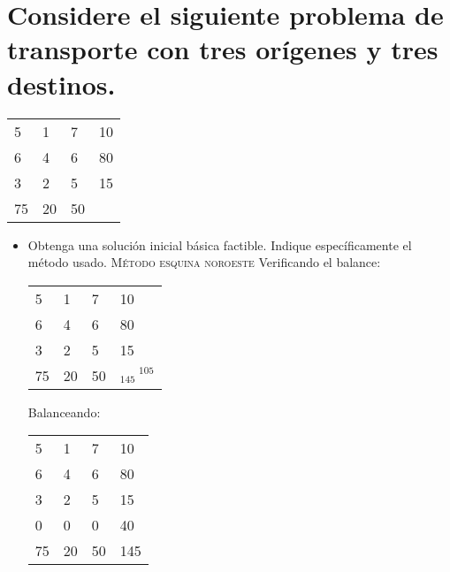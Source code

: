 \section{Considere el siguiente problema de transporte con tres orígenes y tres destinos.}
\centering
 \begin{tabular}{llll}
\cline{1-3}
\multicolumn{1}{|l|}{5} & \multicolumn{1}{l|}{1} & \multicolumn{1}{l|}{7} & 10 \\ \cline{1-3}
\multicolumn{1}{|l|}{6} & \multicolumn{1}{l|}{4} & \multicolumn{1}{l|}{6} & 80 \\ \cline{1-3}
\multicolumn{1}{|l|}{3} & \multicolumn{1}{l|}{2} & \multicolumn{1}{l|}{5} & 15 \\ \cline{1-3}
75 & 20 & 50 & 
\end{tabular}
 
\begin{itemize}
    



\item  Obtenga una solución inicial básica factible. Indique específicamente el método usado.    \textsc{M\'etodo esquina noroeste}
Verificando el balance:
\begin{center}
\begin{tabular}{llll}
\cline{1-3}
\multicolumn{1}{|l|}{5} & \multicolumn{1}{l|}{1} & \multicolumn{1}{l|}{7} & 10 \\ \cline{1-3}
\multicolumn{1}{|l|}{6} & \multicolumn{1}{l|}{4} & \multicolumn{1}{l|}{6} & 80 \\ \cline{1-3}
\multicolumn{1}{|l|}{3} & \multicolumn{1}{l|}{2} & \multicolumn{1}{l|}{5} & 15 \\ \cline{1-3}
75 & 20 & 50 & $_{145}\: ^{105}$
\end{tabular}    
\end{center}

    

Balanceando:\\

\begin{center}
\begin{tabular}{llll}
\cline{1-3}
\multicolumn{1}{|l|}{5} & \multicolumn{1}{l|}{1} & \multicolumn{1}{l|}{7} & 10 \\ \cline{1-3}
\multicolumn{1}{|l|}{6} & \multicolumn{1}{l|}{4} & \multicolumn{1}{l|}{6} & 80 \\ \cline{1-3}
\multicolumn{1}{|l|}{3} & \multicolumn{1}{l|}{2} & \multicolumn{1}{l|}{5} & 15 \\ \cline{1-3}
\multicolumn{1}{|l|}{0} & \multicolumn{1}{l|}{0} & \multicolumn{1}{l|}{0} & 40 \\ \cline{1-3}
75 & 20 & 50 & 145
\end{tabular}   
\end{center}        
    

\end{itemize}

